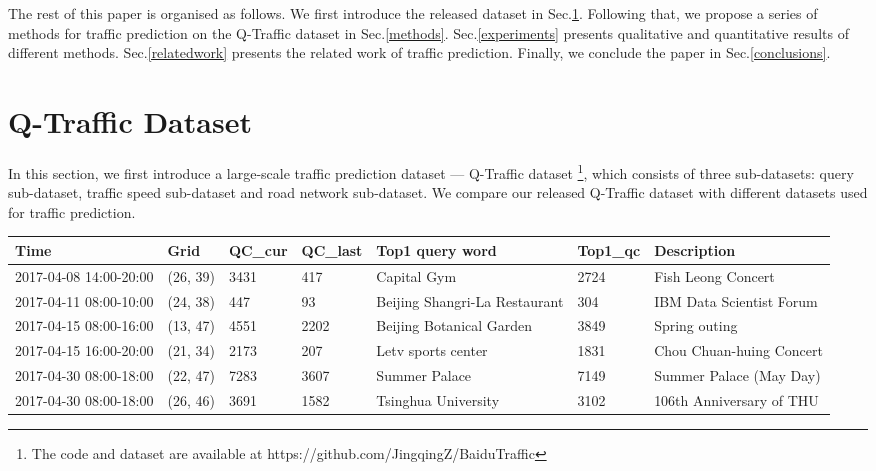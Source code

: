 The rest of this paper is organised as follows. We first introduce the released dataset in Sec.\ref{q-traffic}. Following that, we propose a series of methods for traffic prediction on the Q-Traffic dataset in Sec.\ref{methods}. Sec.\ref{experiments} presents qualitative and quantitative results of different methods. Sec.\ref{relatedwork} presents the related work of traffic prediction. Finally, we conclude the paper in Sec.\ref{conclusions}.

\section{Q-Traffic Dataset}
\label{q-traffic}
In this section, we first introduce a large-scale traffic prediction dataset --- Q-Traffic dataset \footnote{The code and dataset are available at https://github.com/JingqingZ/BaiduTraffic}, which consists of three sub-datasets: query sub-dataset, traffic speed sub-dataset and road network sub-dataset. We compare our released Q-Traffic dataset with different datasets used for traffic prediction.

\begin{table*}[htbp]
\caption{Examples of discovered events, where Time, Grid, QC\_cur, QC\_last, Top1 query word, Top1\_qc, and Description represents the start time and end time, grid coordinates, query counts in the current time period, query counts in the same period of last week, top 1 query word, top 1 query counts and the description of each event, respectively.}
\label{tab:events}
\begin{tabular}{lllllll}
\toprule
Time & Grid & QC\_cur & QC\_last & Top1 query word & Top1\_qc & Description  \\
\midrule
2017-04-08 14:00-20:00 &  (26, 39) & 3431 & 417 & Capital Gym & 2724 & Fish Leong Concert \\
2017-04-11 08:00-10:00 &  (24, 38) & 447 & 93 & Beijing Shangri-La Restaurant & 304 & IBM Data Scientist Forum \\
2017-04-15 08:00-16:00 &  (13, 47) & 4551 & 2202 & Beijing Botanical Garden & 3849 & Spring outing \\
2017-04-15 16:00-20:00 &  (21, 34) & 2173 & 207 & Letv sports center & 1831 & Chou Chuan-huing Concert \\
2017-04-30 08:00-18:00 &  (22, 47) & 7283 & 3607 & Summer Palace & 7149 & Summer Palace (May Day) \\
2017-04-30 08:00-18:00 &  (26, 46) & 3691 & 1582 & Tsinghua University & 3102 & 106th Anniversary of THU \\
\bottomrule
\end{tabular}
\end{table*}

